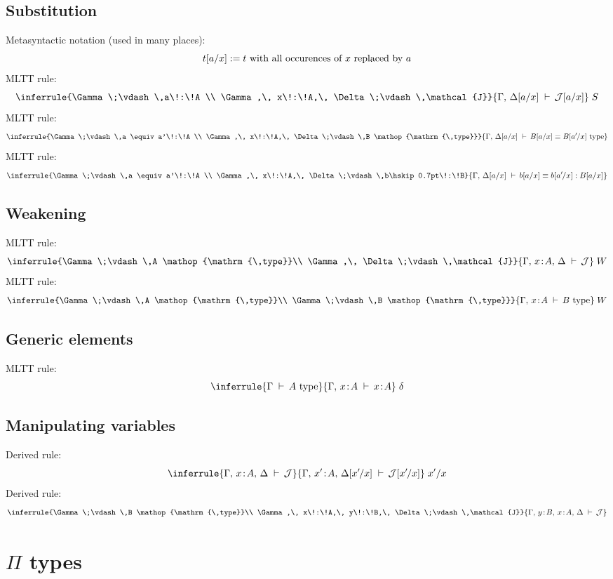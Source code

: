 \documentclass[12pt]{article}
\renewcommand{\.}{\hskip 0.7pt}
\renewcommand{\d}{\;\vdash\,}
\DeclareMathOperator{\type}{\,type}
\begin{document}
\subsection{Substitution}

Metasyntactic notation (used in many places):
$$t[a/x] := t \textup{ with all occurences of } x \textup{ replaced by } a$$
MLTT rule:
$$\inferrule
{\Gamma \d a\!:\!A \\ \Gamma,\, x\!:\!A,\, \Delta \d \mathcal{J}}
{\Gamma,\, \Delta[a/x] \d \mathcal{J}[a/x]}
\;S
$$
MLTT rule:
$$\inferrule
{\Gamma \d a \equiv a'\!:\!A \\ \Gamma,\, x\!:\!A,\, \Delta \d B \type}
{\Gamma,\, \Delta[a/x] \d B[a/x] \equiv B[a'\.\!/x] \type}
$$
MLTT rule:
$$\inferrule
{\Gamma \d a \equiv a'\!:\!A \\ \Gamma,\, x\!:\!A,\, \Delta \d b\.\!:\!B}
{\Gamma,\, \Delta[a/x] \d b[a/x] \equiv b[a'\.\!/x] : B[a/x]}
$$

\subsection{Weakening}

MLTT rule:
$$\inferrule
{\Gamma \d A \type \\ \Gamma,\, \Delta \d \mathcal{J}}
{\Gamma,\, x\!:\!A,\, \Delta \d \mathcal{J}}
\;W
$$
MLTT rule:
$$\inferrule
{\Gamma \d A \type \\ \Gamma \d B \type}
{\Gamma,\, x\!:\!A \d B \type}
\;W
$$

\subsection{Generic elements}

MLTT rule:%
$$\inferrule
{\Gamma \d A \type}
{\Gamma,\, x\!:\!A \d x\!:\!A}
\;\delta
$$

\subsection{Manipulating variables}

Derived rule:
$$\inferrule
{\Gamma,\, x\!:\!A,\, \Delta \d \mathcal{J}}
{\Gamma,\, x'\!:\!A,\, \Delta[x'\.\!/x] \d \mathcal{J}[x'\.\!/x]}
\;x'/x
$$
Derived rule:
$$\inferrule
{\Gamma \d B \type \\ \Gamma,\, x\!:\!A,\, y\!:\!B,\, \Delta \d \mathcal{J}}
{\Gamma,\, y\!:\!B,\, x\!:\!A,\, \Delta \d \mathcal{J}}
$$

\section{$\Pi$ types}
\end{document}
